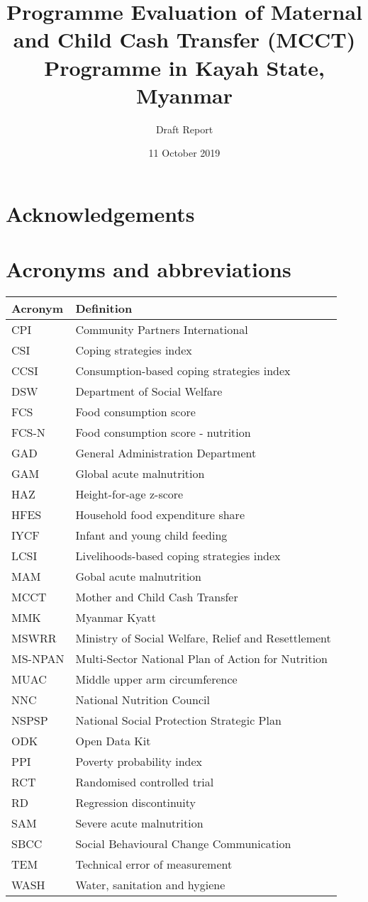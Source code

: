 \documentclass[12pt,a4paper]{article}
\title{\vspace{8cm} \LARGE{Programme Evaluation of Maternal and Child Cash Transfer (MCCT) Programme in Kayah State, Myanmar}}
\subtitle{Draft Report}
\author{}
\date{11 October 2019}
\begin{document}
\maketitle

\newpage

{
\hypersetup{linkcolor=black}
\setcounter{tocdepth}{3}
\tableofcontents
}
\listoftables
\listoffigures
\newpage

\hypertarget{acknowledgements}{%
\section*{Acknowledgements}\label{acknowledgements}}

\newpage

\hypertarget{acronyms-and-abbreviations}{%
\section*{Acronyms and abbreviations}\label{acronyms-and-abbreviations}}

\begin{longtable}[]{@{}ll@{}}
\toprule
Acronym & Definition\tabularnewline
\midrule
\endhead
CPI & Community Partners International\tabularnewline
CSI & Coping strategies index\tabularnewline
CCSI & Consumption-based coping strategies index\tabularnewline
DSW & Department of Social Welfare\tabularnewline
FCS & Food consumption score\tabularnewline
FCS-N & Food consumption score - nutrition\tabularnewline
GAD & General Administration Department\tabularnewline
GAM & Global acute malnutrition\tabularnewline
HAZ & Height-for-age z-score\tabularnewline
HFES & Household food expenditure share\tabularnewline
IYCF & Infant and young child feeding\tabularnewline
LCSI & Livelihoods-based coping strategies index\tabularnewline
MAM & Gobal acute malnutrition\tabularnewline
MCCT & Mother and Child Cash Transfer\tabularnewline
MMK & Myanmar Kyatt\tabularnewline
MSWRR & Ministry of Social Welfare, Relief and Resettlement\tabularnewline
MS-NPAN & Multi-Sector National Plan of Action for Nutrition\tabularnewline
MUAC & Middle upper arm circumference\tabularnewline
NNC & National Nutrition Council\tabularnewline
NSPSP & National Social Protection Strategic Plan\tabularnewline
ODK & Open Data Kit\tabularnewline
PPI & Poverty probability index\tabularnewline
RCT & Randomised controlled trial\tabularnewline
RD & Regression discontinuity\tabularnewline
SAM & Severe acute malnutrition\tabularnewline
SBCC & Social Behavioural Change Communication\tabularnewline
TEM & Technical error of measurement\tabularnewline
WASH & Water, sanitation and hygiene\tabularnewline
\bottomrule
\end{longtable}
\end{document}
